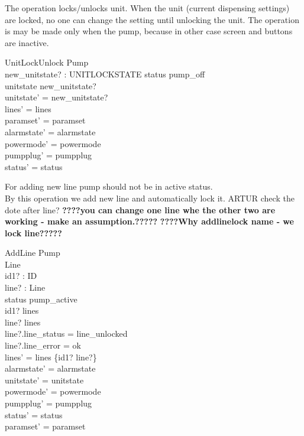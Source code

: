 \documentclass{article}
\begin{document}
	
		The operation locks/unlocks unit. When the unit (current dispensing settings) are locked, no one can change the setting until unlocking the unit. The operation is may be made only when the pump, because in other case screen and buttons are inactive.\\
    \begin{schema}{UnitLockUnlock}
		\Delta Pump \\
		new\_unitstate? : UNITLOCKSTATE
	\where
		status \neq pump\_off \\ 
		unitstate \neq new\_unitstate? \\
		unitstate' = new\_unitstate? \\
    	lines' = lines  \\
    	paramset' = paramset\\
    	alarmstate' = alarmstate \\
    	powermode' = powermode \\
    	pumpplug' = pumpplug \\
    	status' = status \\	
	\end{schema}


		For adding new line pump should not be in active status.\\
		By this operation we add new line and automatically lock it. ARTUR check the dote after line?
\textbf{????you can change one line whe the other two are working - make an assumption.?????}
\textbf{????Why addlinelock name - we lock line?????}
    \begin{schema}{AddLine}
		\Delta Pump \\
		\Delta Line \\
		id1? : ID \\
		line? : Line \\
	\where
	    status \neq pump\_active \\
		id1? \notin \dom lines \\
		line? \notin \ran lines \\
		line?.line\_status = line\_unlocked \\
		line?.line\_error = ok\\
    	lines' = lines \cup \{id1? \mapsto line?\} \\
    	alarmstate' = alarmstate \\
    	unitstate' = unitstate \\
    	powermode' = powermode \\
    	pumpplug' = pumpplug \\
    	status' = status \\
    	paramset' = paramset

	\end{schema}
\end{document}
